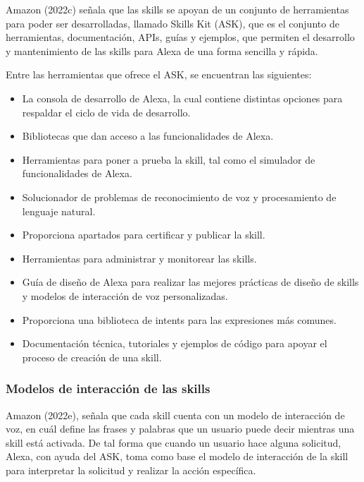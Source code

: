 Amazon (2022c) señala que las skills se apoyan de un conjunto de herramientas para poder ser desarrolladas, llamado Skills Kit (ASK), que es el conjunto de herramientas, documentación, APIs, guías y ejemplos, que permiten el desarrollo y mantenimiento de las skills para Alexa de una forma sencilla y rápida.

Entre las herramientas que ofrece el ASK, se encuentran las siguientes:

\begin{itemize}
  \item La consola de desarrollo de Alexa, la cual contiene distintas opciones para respaldar el ciclo de vida de desarrollo.
  \item Bibliotecas que dan acceso a las funcionalidades de Alexa.
  \item Herramientas para poner a prueba la skill, tal como el simulador de funcionalidades de Alexa.
  \item Solucionador de problemas de reconocimiento de voz y procesamiento de lenguaje natural.
  \item Proporciona apartados para certificar y publicar la skill.
  \item Herramientas para administrar y monitorear las skills.
  \item Guía de diseño de Alexa para realizar las mejores prácticas de diseño de skills y modelos de interacción de voz personalizadas.
  \item Proporciona una biblioteca de intents para las expresiones más comunes.
  \item Documentación técnica, tutoriales y ejemplos de código para apoyar el proceso de creación de una skill.
\end{itemize}


\subsubsection{Modelos de interacción de las skills}
\label{ModelosInteraccioncapIV}

Amazon (2022e), señala que cada skill cuenta con un modelo de interacción de voz, en cuál define las frases y palabras que un usuario puede decir mientras una skill está activada. De tal forma que cuando un usuario hace alguna solicitud, Alexa, con ayuda del ASK, toma como base el modelo de interacción de la skill para interpretar la solicitud y realizar la acción específica.

